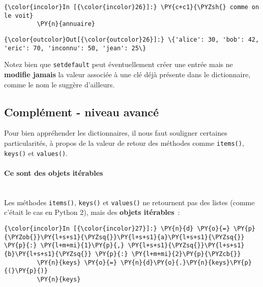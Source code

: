     \begin{Verbatim}[commandchars=\\\{\}]
{\color{incolor}In [{\color{incolor}26}]:} \PY{c+c1}{\PYZsh{} comme on le voit}
         \PY{n}{annuaire}
\end{Verbatim}


\begin{Verbatim}[commandchars=\\\{\}]
{\color{outcolor}Out[{\color{outcolor}26}]:} \{'alice': 30, 'bob': 42, 'eric': 70, 'inconnu': 50, 'jean': 25\}
\end{Verbatim}
            
    Notez bien que \texttt{setdefault} peut éventuellement créer une entrée
mais ne \textbf{modifie jamais} la valeur associée à une clé déjà
présente dans le dictionnaire, comme le nom le suggère d'ailleurs.

    \hypertarget{compluxe9ment---niveau-avancuxe9}{%
\subsection{Complément - niveau
avancé}\label{compluxe9ment---niveau-avancuxe9}}

    Pour bien appréhender les dictionnaires, il nous faut souligner
certaines particularités, à propos de la valeur de retour des méthodes
comme \texttt{items()}, \texttt{keys()} et \texttt{values()}.

    \hypertarget{ce-sont-des-objets-ituxe9rables}{%
\paragraph{Ce sont des objets
itérables\\\\}\label{ce-sont-des-objets-ituxe9rables}}

    Les méthodes \texttt{items()}, \texttt{keys()} et \texttt{values()} ne
retournent pas des listes (comme c'était le cas en Python 2), mais des
\textbf{objets itérables}~:

    \begin{Verbatim}[commandchars=\\\{\}]
{\color{incolor}In [{\color{incolor}27}]:} \PY{n}{d} \PY{o}{=} \PY{p}{\PYZob{}}\PY{l+s+s1}{\PYZsq{}}\PY{l+s+s1}{a}\PY{l+s+s1}{\PYZsq{}} \PY{p}{:} \PY{l+m+mi}{1}\PY{p}{,} \PY{l+s+s1}{\PYZsq{}}\PY{l+s+s1}{b}\PY{l+s+s1}{\PYZsq{}} \PY{p}{:} \PY{l+m+mi}{2}\PY{p}{\PYZcb{}}
         \PY{n}{keys} \PY{o}{=} \PY{n}{d}\PY{o}{.}\PY{n}{keys}\PY{p}{(}\PY{p}{)}
         \PY{n}{keys}
\end{Verbatim}


